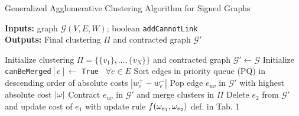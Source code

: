 \begin{algorithm}[t]
  \caption{Generalized Agglomerative Clustering Algorithm for Signed Graphs}
   \hspace*{\algorithmicindent} \textbf{Inputs:} graph $\mathcal{G}(V,E,W)$; boolean {\color{blue}\texttt{addCannotLink}}  \\
  \hspace*{\algorithmicindent} \textbf{Outputs:} Final clustering $\Pi$ and contracted graph $\mathcal{G}'$\\
  \hspace*{\algorithmicindent} 
  \begin{algorithmic}[1]
      \State Initialize clustering $\Pi=\{\{v_1\}, \ldots, \{v_N\}\}$ and contracted graph $\mathcal{G}' \gets \mathcal{G}$
      \State Initialize \texttt{canBeMerged}$[e] \gets$ \texttt{True} $\,\,\, \forall e\in E$
      \State Sort edges in priority queue (PQ) in descending order of absolute costs $|w^+_e - w^-_e|$ 
      \State
        \State Pop edge $e_{uv}$ in $\mathcal{G}'$ with highest absolute cost $|\omega|$
          \State Contract $e_{uv}$ in $\mathcal{G}'$ and merge clusters in $\Pi$
            \State Delete $e_2$ from $\mathcal{G}'$ and update cost of $e_1$ with update rule $f(\omega_{e_1},\omega_{e_2})$ def. in Tab. 1 
          \EndFor

\end{algorithmic}
\end{algorithm}
